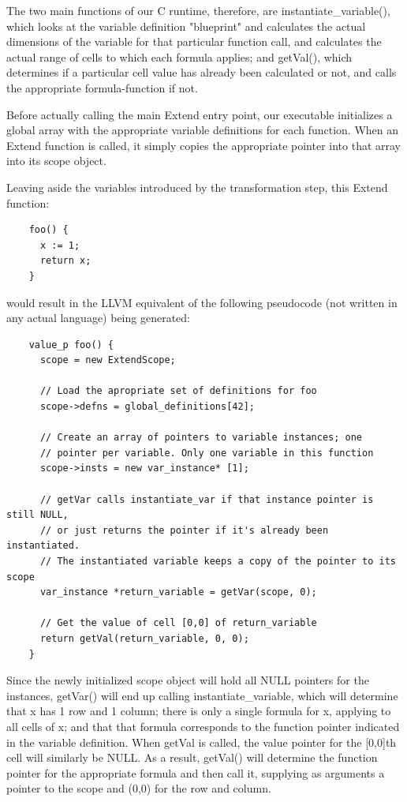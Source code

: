   The two main functions of our C runtime, therefore, are instantiate\_variable(), which looks at the variable definition "blueprint" and calculates the actual dimensions of the variable for that particular function call, and calculates the actual range of cells to which each formula applies; and getVal(), which determines if a particular cell value has already been calculated or not, and calls the appropriate formula-function if not.

  Before actually calling the main Extend entry point, our executable initializes a global array with the appropriate variable definitions for each function. When an Extend function is called, it simply copies the appropriate pointer into that array into its scope object.

  Leaving aside the variables introduced by the transformation step, this Extend function:
  \begin{lstlisting}
    foo() {
      x := 1;
      return x;
    }
  \end{lstlisting}
  \medskip \noindent
  would result in the LLVM equivalent of the following pseudocode (not written in any actual language) being generated:

  \begin{lstlisting}
    value_p foo() {
      scope = new ExtendScope;

      // Load the apropriate set of definitions for foo
      scope->defns = global_definitions[42];

      // Create an array of pointers to variable instances; one
      // pointer per variable. Only one variable in this function
      scope->insts = new var_instance* [1];

      // getVar calls instantiate_var if that instance pointer is still NULL,
      // or just returns the pointer if it's already been instantiated.
      // The instantiated variable keeps a copy of the pointer to its scope
      var_instance *return_variable = getVar(scope, 0);

      // Get the value of cell [0,0] of return_variable
      return getVal(return_variable, 0, 0);
    }
  \end{lstlisting}
  \medskip \noindent

  Since the newly initialized scope object will hold all NULL pointers for the instances, getVar() will end up calling instantiate\_variable, which will  determine that x has 1 row and 1 column; there is only a single formula for x, applying to all cells of x; and that that formula corresponds to the function pointer indicated in the variable definition.
  When getVal is called, the value pointer for the [0,0]th cell will similarly be NULL. As a result, getVal() will determine the function pointer for the appropriate formula and then call it, supplying as arguments a pointer to the scope and (0,0) for the row and column.

